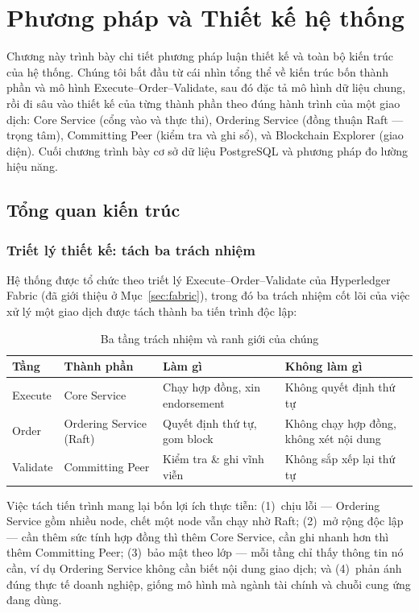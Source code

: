 \chapter{Phương pháp và Thiết kế hệ thống}
\label{chap:methodology}

Chương này trình bày chi tiết phương pháp luận thiết kế và toàn bộ kiến trúc của
hệ thống. Chúng tôi bắt đầu từ cái nhìn tổng thể về kiến trúc bốn thành phần và
mô hình Execute--Order--Validate, sau đó đặc tả mô hình dữ liệu chung, rồi đi
sâu vào thiết kế của từng thành phần theo đúng hành trình của một giao dịch:
Core Service (cổng vào và thực thi), Ordering Service (đồng thuận Raft ---
trọng tâm), Committing Peer (kiểm tra và ghi sổ), và Blockchain Explorer (giao
diện). Cuối chương trình bày cơ sở dữ liệu PostgreSQL và phương pháp đo lường
hiệu năng.

\section{Tổng quan kiến trúc}
\label{sec:architecture-overview}

\subsection{Triết lý thiết kế: tách ba trách nhiệm}

Hệ thống được tổ chức theo triết lý Execute--Order--Validate của
Hyperledger Fabric (đã giới thiệu ở Mục~\ref{sec:fabric}), trong đó ba trách
nhiệm cốt lõi của việc xử lý một giao dịch được tách thành ba tiến trình độc
lập:

\begin{table}[H]
\centering
\caption{Ba tầng trách nhiệm và ranh giới của chúng}
\label{tab:three-tiers}
\begin{tabular}{@{}p{2.6cm}p{3.4cm}p{3.6cm}p{3.2cm}@{}}
\toprule
\textbf{Tầng} & \textbf{Thành phần} & \textbf{Làm gì} & \textbf{Không làm gì} \\
\midrule
Execute & Core Service & Chạy hợp đồng, xin endorsement & Không quyết định thứ tự \\
Order & Ordering Service (Raft) & Quyết định thứ tự, gom block & Không chạy hợp đồng, không xét nội dung \\
Validate & Committing Peer & Kiểm tra \& ghi vĩnh viễn & Không sắp xếp lại thứ tự \\
\bottomrule
\end{tabular}
\end{table}

Việc tách tiến trình mang lại bốn lợi ích thực tiễn: (1)~chịu lỗi ---
Ordering Service gồm nhiều node, chết một node vẫn chạy nhờ Raft; (2)~mở
rộng độc lập --- cần thêm sức tính hợp đồng thì thêm Core Service, cần ghi
nhanh hơn thì thêm Committing Peer; (3)~bảo mật theo lớp --- mỗi tầng
chỉ thấy thông tin nó cần, ví dụ Ordering Service không cần biết nội dung giao
dịch; và (4)~phản ánh đúng thực tế doanh nghiệp, giống mô hình mà ngành
tài chính và chuỗi cung ứng đang dùng.

